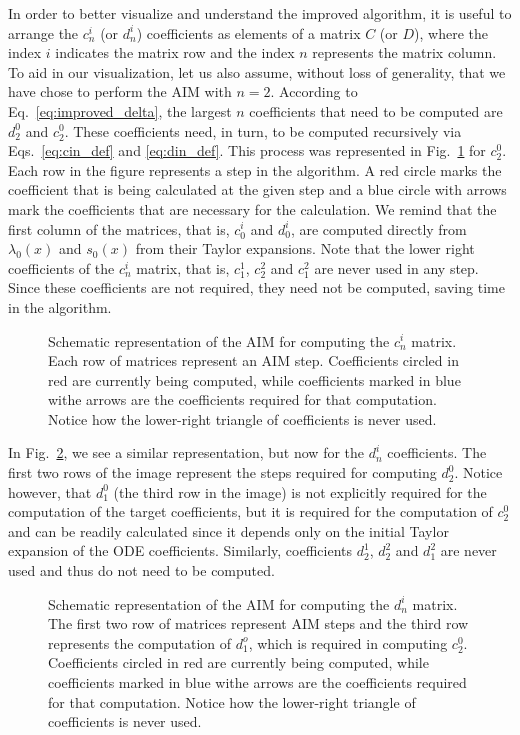 In order to better visualize and understand the improved algorithm, it is useful to arrange the $c^i_n$ (or $d^i_n$) coefficients as elements of a matrix $C$ (or $D$), where the index $i$ indicates the matrix row and the index $n$ represents the matrix column. To aid in our visualization, let us also assume, without loss of generality, that we have chose to perform the AIM with $n=2$. According to Eq.~\eqref{eq:improved_delta}, the largest $n$ coefficients that need to be computed  are $d^0_2$ and $c^0_2$. These coefficients need, in turn, to be computed recursively via Eqs.~\eqref{eq:cin_def} and \eqref{eq:din_def}. This process was represented in Fig.~\ref{fig:aim_coeffs_c} for $c^0_2$. Each row in the figure represents a step in the algorithm. A red circle marks the coefficient that is being calculated at the given step and a blue circle with arrows mark the coefficients that are necessary for the calculation. We remind that the first column of the matrices, that is, $c^i_0$ and $d^i_0$, are computed directly from $\lambda_0(x)$ and $s_0(x)$ from their Taylor expansions. Note that the lower right coefficients of the $c^i_n$ matrix, that is, $c^1_1$, $c^2_2$ and $c^2_1$ are never used in any step. Since these coefficients are not required, they need not be computed, saving time in the algorithm.

\begin{figure}[!ht]
  \centering
  
  \caption{Schematic representation of the AIM for computing the $c^i_n$ matrix. Each row of matrices represent an AIM step. Coefficients circled in red are currently being computed, while coefficients marked in blue withe arrows are the coefficients required for that computation. Notice how the lower-right triangle of coefficients is never used.}
  \label{fig:aim_coeffs_c}
\end{figure}

In  Fig.~\ref{fig:aim_coeffs_d}, we see a similar representation, but now for the $d^i_n$ coefficients. The first two rows of the image represent the steps required for computing $d^0_2$. Notice however, that $d^0_1$ (the third row in the image) is not explicitly required for the computation of the target coefficients, but it is required for the computation of $c^0_2$ and can be readily calculated since it depends only on the initial Taylor expansion of the ODE coefficients. Similarly, coefficients $d^1_2$, $d^2_2$ and $d^2_1$ are never used and thus do not need to be computed.

\begin{figure}[!ht]
  \centering
  
  \caption{Schematic representation of the AIM for computing the $d^i_n$ matrix. The first two row of matrices represent AIM steps and the third row represents the computation of $d^o_1$, which is required in computing $c^0_2$. Coefficients circled in red are currently being computed, while coefficients marked in blue withe arrows are the coefficients required for that computation. Notice how the lower-right triangle of coefficients is never used.}
  \label{fig:aim_coeffs_d}
\end{figure}

